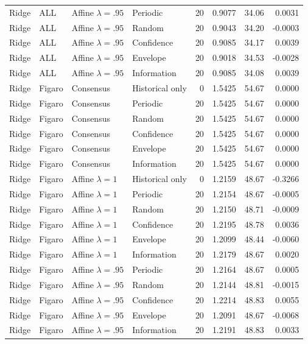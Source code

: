 \begin{longtable}{llllrrrr}
Ridge & ALL & Affine $\lambda=.95$ & Periodic & 20 & 0.9077 & 34.06 & 0.0031 \\
Ridge & ALL & Affine $\lambda=.95$ & Random & 20 & 0.9043 & 34.20 & -0.0003 \\
Ridge & ALL & Affine $\lambda=.95$ & Confidence & 20 & 0.9085 & 34.17 & 0.0039 \\
Ridge & ALL & Affine $\lambda=.95$ & Envelope & 20 & 0.9018 & 34.53 & -0.0028 \\
Ridge & ALL & Affine $\lambda=.95$ & Information & 20 & 0.9085 & 34.08 & 0.0039 \\
Ridge & Figaro & Consensus & Historical only & 0 & 1.5425 & 54.67 & 0.0000 \\
Ridge & Figaro & Consensus & Periodic & 20 & 1.5425 & 54.67 & 0.0000 \\
Ridge & Figaro & Consensus & Random & 20 & 1.5425 & 54.67 & 0.0000 \\
Ridge & Figaro & Consensus & Confidence & 20 & 1.5425 & 54.67 & 0.0000 \\
Ridge & Figaro & Consensus & Envelope & 20 & 1.5425 & 54.67 & 0.0000 \\
Ridge & Figaro & Consensus & Information & 20 & 1.5425 & 54.67 & 0.0000 \\
Ridge & Figaro & Affine $\lambda=1$ & Historical only & 0 & 1.2159 & 48.67 & -0.3266 \\
Ridge & Figaro & Affine $\lambda=1$ & Periodic & 20 & 1.2154 & 48.67 & -0.0005 \\
Ridge & Figaro & Affine $\lambda=1$ & Random & 20 & 1.2150 & 48.71 & -0.0009 \\
Ridge & Figaro & Affine $\lambda=1$ & Confidence & 20 & 1.2195 & 48.78 & 0.0036 \\
Ridge & Figaro & Affine $\lambda=1$ & Envelope & 20 & 1.2099 & 48.44 & -0.0060 \\
Ridge & Figaro & Affine $\lambda=1$ & Information & 20 & 1.2179 & 48.67 & 0.0020 \\
Ridge & Figaro & Affine $\lambda=.95$ & Periodic & 20 & 1.2164 & 48.67 & 0.0005 \\
Ridge & Figaro & Affine $\lambda=.95$ & Random & 20 & 1.2144 & 48.81 & -0.0015 \\
Ridge & Figaro & Affine $\lambda=.95$ & Confidence & 20 & 1.2214 & 48.83 & 0.0055 \\
Ridge & Figaro & Affine $\lambda=.95$ & Envelope & 20 & 1.2091 & 48.67 & -0.0068 \\
Ridge & Figaro & Affine $\lambda=.95$ & Information & 20 & 1.2191 & 48.83 & 0.0033 \\

\end{longtable}
